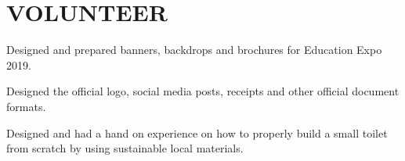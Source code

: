 \section{VOLUNTEER}
  \begin{vitemize}
    \item Designed and prepared banners, backdrops and brochures for Education Expo 2019.
    \item Designed the official logo, social media posts, receipts and other official document formats.
  \end{vitemize}
  \begin{vitemize}
    \item Designed and had a hand on experience on how to properly build a small toilet from scratch by using sustainable local materials.
  \end{vitemize}
\sectionsep
